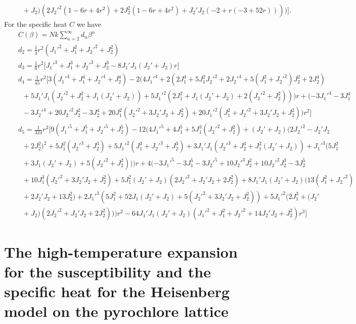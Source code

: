 \documentclass[aps,twocolumn,groupedaddress]{revtex4}
\begin{document}
\begin{widetext}
\begin{eqnarray}
&& \; \; +J_2)(2J_2'^2(1-6r+4r^2)+2J_2^2(1-6r+4r^2)+J_2'J_2(-2+r(-3+52r))))\Big].\nonumber
\end{eqnarray}
For the specific heat $C$ we have
\begin{eqnarray}
&&C(\beta)=Nk\sum_{n=2}^\infty d_n\beta^n \\
&&d_2=\frac{1}{3}r^2(J_1'^2+J_1^2+J_2'^2+J_2^2)\nonumber\\
&&d_3=\frac{1}{6}r^2\Big[J_1'^3+J_1^3+J_2'^3+J_2^3-8J_1'J_1(J_2'+J_2)r\Big]\nonumber\\
&&d_4=\frac{1}{45}r^2\Big[3(J_1'^4+J_1^4+J_2'^4+J_2^4)-2(4J_1'^4+2(2J_1^4+5 J_1^2J_2'^2+2J_2'^4+5(J_1^2+J_2'^2)J_2^2+2J_2^4)\nonumber\\
&& \; \; +5J_1'J_1(J_2'^2+J_2^2+J_1(J_2'+J_2))+5J_1'^2(2J_1^2+J_1(J_2'+J_2)+2(J_2'^2+J_2^2)))r+(-3J_1'^4-3 J_1^4\nonumber\\
&& \; \; -3J_2'^4+20J_2'^2J_2^2-3J_2^4+20J_1^2(J_2'^2+3J_2'J_2+J_2^2)+20J_1'^2(J_1^2+J_2'^2+3J_2'J_2+J_2^2))r^2\Big]\nonumber\\
&&d_5=\frac{1}{324}r^2\Big[9(J_1'^5+J_1^5+J_2'^5+J_2^5)-12(4 J_1'^5+4J_1^5+5J_1^3(J_2'^2+J_2^2)+(J_2'+J_2)(2 J_2'^2-J_2'J_2\nonumber\\
&& \; \; +2J_2^2)^2+5J_1^2(J_2'^3+J_2^3)+5J_1'^2(J_1^3+J_2'^3+J_2^3)+3J_1'J_1(J_2'^3+J_2^3+J_1^2(J_2'+J_2))+J_1'^3(5J_1^2\nonumber\\
&& \; \; +3J_1(J_2'+J_2)+5(J_2'^2+J_2^2)))r+4(-3J_1'^5-3J_1^5-3J_2'^5+10J_2'^3J_2^2+10J_2'^2J_2^3-3J_2^5\nonumber\\
&& \; \; +10J_1^3(J_2'^2+3J_2'J_2+J_2^2)+5J_1^2(J_2'+J_2)(2J_2'^2+J_2'J_2+2J_2^2)+8J_1'J_1(J_2'+J_2)(13(J_1^2+J_2'^2)\nonumber\\
&& \; \; +2 J_2'J_2+13J_2^2)+2J_1'^3(5J_1^2+52J_1(J_2'+J_2)+5(J_2'^2+3J_2'J_2+J_2^2))+5J_1'^2(2J_1^3+(J_2'\nonumber\\
&& \; \; +J_2)(2J_2'^2+J_2'J_2+2J_2^2)))r^2-64J_1'J_1(J_2'+J_2)(J_1'^2+J_1^2+J_2'^2+14J_2'J_2+J_2^2)r^3\Big]\nonumber
\end{eqnarray}
\end{widetext}

\section{The high-temperature
expansion for the susceptibility and the specific heat for the
Heisenberg model on the pyrochlore lattice}
\label{app_pyro}
\end{document}
